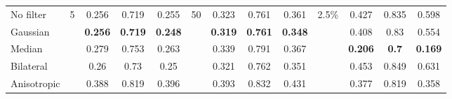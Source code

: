 \begin{table}[ht]
\begin{tabular}{rrrrrrrrrrrrr}
    \multicolumn{1}{l}{No filter} & \multirow{5}[1]{*}{5} & \multicolumn{1}{c}{0.256} & \multicolumn{1}{c}{0.719} & \multicolumn{1}{c}{0.255} & \multirow{5}[1]{*}{50} & \multicolumn{1}{c}{0.323} & \multicolumn{1}{c}{0.761} & \multicolumn{1}{c}{0.361} & \multirow{5}[1]{*}{2.5\%} & \multicolumn{1}{c}{0.427} & \multicolumn{1}{c}{0.835} & \multicolumn{1}{c}{0.598} \\
    \multicolumn{1}{l}{Gaussian} &       & \multicolumn{1}{c}{\textbf{0.256}} & \multicolumn{1}{c}{\textbf{0.719}} & \multicolumn{1}{c}{\textbf{0.248}} &       & \multicolumn{1}{c}{\textbf{0.319}} & \multicolumn{1}{c}{\textbf{0.761}} & \multicolumn{1}{c}{\textbf{0.348}} &       & \multicolumn{1}{c}{0.408} & \multicolumn{1}{c}{0.83} & \multicolumn{1}{c}{0.554} \\
    \multicolumn{1}{l}{Median} &       & \multicolumn{1}{c}{0.279} & \multicolumn{1}{c}{0.753} & \multicolumn{1}{c}{0.263} &       & \multicolumn{1}{c}{0.339} & \multicolumn{1}{c}{0.791} & \multicolumn{1}{c}{0.367} &       & \multicolumn{1}{c}{\textbf{0.206}} & \multicolumn{1}{c}{\textbf{0.7}} & \multicolumn{1}{c}{\textbf{0.169}} \\
    \multicolumn{1}{l}{Bilateral} &       & \multicolumn{1}{c}{0.26} & \multicolumn{1}{c}{0.73} & \multicolumn{1}{c}{0.25} &       & \multicolumn{1}{c}{0.321} & \multicolumn{1}{c}{0.762} & \multicolumn{1}{c}{0.351} &       & \multicolumn{1}{c}{0.453} & \multicolumn{1}{c}{0.849} & \multicolumn{1}{c}{0.631} \\
    \multicolumn{1}{l}{Anisotropic} &       & \multicolumn{1}{c}{0.388} & \multicolumn{1}{c}{0.819} & \multicolumn{1}{c}{0.396} &       & \multicolumn{1}{c}{0.393} & \multicolumn{1}{c}{0.832} & \multicolumn{1}{c}{0.431} &       & \multicolumn{1}{c}{0.377} & \multicolumn{1}{c}{0.819} & \multicolumn{1}{c}{0.358} \\
    
    \midrule
    

\end{tabular}
\end{table}
